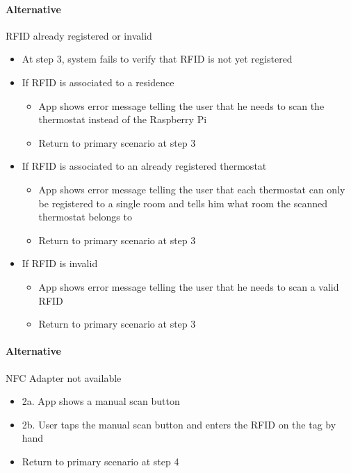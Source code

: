 \paragraph{Alternative} RFID already registered or invalid
\begin{itemize}
    \item At step 3, system fails to verify that RFID is not yet registered
    \item{If RFID is associated to a residence
        \begin{itemize}
        \item App shows error message telling the user that he needs to scan the  thermostat instead of the Raspberry Pi
        \item Return to primary scenario at step 3
        \end{itemize}
        }
    \item {If RFID is associated to an already registered thermostat
        \begin{itemize}
        \item App shows error message telling the user that each thermostat can only be registered to a single room and tells him what room the scanned thermostat belongs to
        \item Return to primary scenario at step 3
        \end{itemize}
    }
    \item {If RFID is invalid
        \begin{itemize}
        \item App shows error message telling the user that he needs to scan a valid RFID
        \item Return to primary scenario at step 3
        \end{itemize}
    }
\end{itemize}

\paragraph{Alternative} NFC Adapter not available
\begin{itemize}
    \item 2a. App shows a manual scan button
    \item 2b. User taps the manual scan button and enters the RFID on the tag by hand
    \item Return to primary scenario at step 4
\end{itemize}

